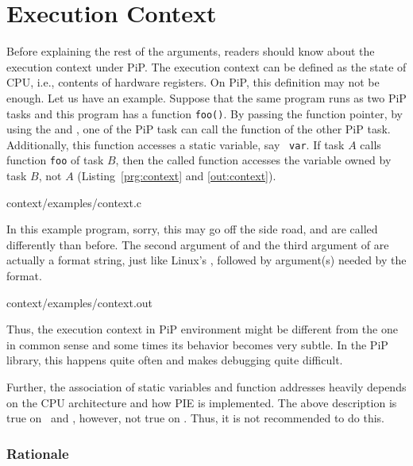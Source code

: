 
\section{Execution Context}\label{sec:context}

Before explaining the rest of the arguments, readers should know about
the execution context under PiP. The execution context can be defined
as the state of CPU, i.e., contents of hardware registers. On PiP,
this definition may not be enough. Let us have an example. Suppose
that the same program runs as two PiP tasks and this program has a
function {\tt foo()}. By passing the function pointer, by using the
 and , one of
the PiP task can call the function of the other PiP
task. Additionally, this function accesses a static variable, say {\tt
  var}. If task $A$ calls function {\tt foo} of task $B$, then the
called function accesses the variable owned by task $B$, not $A$
(Listing~\ref{prg:context} and \ref{out:context}).

 {context/examples/context.c}

In this example program, sorry, this may go off the side road,
 and 
 are called differently than
before. The second argument of  and the
third argument of  are actually a format
string, just like Linux's , followed by argument(s) 
needed by the format. 


                {context/examples/context.out}

Thus, the execution context in PiP environment might be different from
the one in common sense and some times its behavior becomes very
subtle. In the PiP library, this happens quite often and makes
debugging quite difficult. 

Further, the association of static variables and function addresses
heavily depends on the CPU architecture and how PIE is
implemented. The above description is true on \AMD\ and \ARM,
however, not true on \INTEL. Thus, it is not recommended to
do this. 

\subsubsection*{Rationale}

